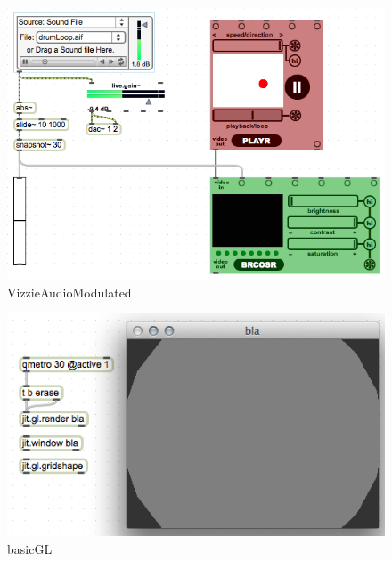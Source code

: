 \begin{figure}[h]
	\begin{center}
		\includegraphics[width = 14cm]{img/VizzieAudioModulated.png}
		\caption{VizzieAudioModulated}
		\label{fig:VizzieAudioModulated}
	\end{center}
\end{figure}

\begin{figure}[h]
	\begin{center}
		\includegraphics[width = 14cm]{img/basicGL.png}
		\caption{basicGL}
		\label{fig:basicGL}
	\end{center}
\end{figure}


